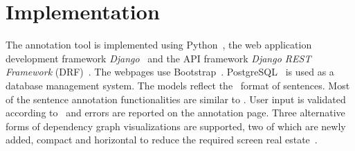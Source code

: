 \section{Implementation}
\label{sec:implementation}

The annotation tool is implemented using Python~\cite{python}, the web application development framework \textit{Django}~\cite{django} and the API framework \textit{Django REST Framework} (DRF)~\cite{drf}. The webpages use Bootstrap~\cite{bootstrap}.
PostgreSQL~\cite{psql} is used as a database management system.
The models reflect the \ud\ format of sentences.
Most of the sentence annotation functionalities are similar to \boatvone.
User input is validated according to \ud\ and errors are reported on the annotation page.
Three alternative forms of dependency graph visualizations are supported, two of which are newly added, compact and horizontal to reduce the required screen real estate~\cite{spacy,spyssalo}.


